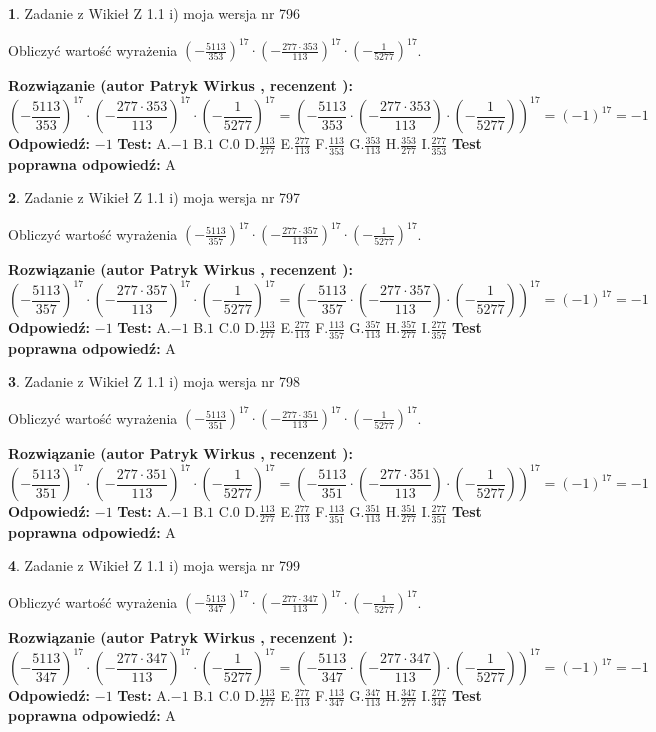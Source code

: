 \documentclass[12pt, a4paper]{article}
\theoremstyle{definition} %
\newtheorem{zad}{}
\newcommand{\zadStart}[1]{\begin{zad}#1\newline}
\newcommand{\zadStop}{\end{zad}}
\newcommand{\rozwStart}[2]{\noindent \textbf{Rozwiązanie (autor #1 , recenzent #2): }\newline}
\newcommand{\rozwStop}{\newline}
\newcommand{\odpStart}{\noindent \textbf{Odpowiedź:}\newline}
\newcommand{\odpStop}{\newline}
\newcommand{\testStart}{\noindent \textbf{Test:}\newline}
\newcommand{\testStop}{\newline}
\newcommand{\kluczStart}{\noindent \textbf{Test poprawna odpowiedź:}\newline}
\newcommand{\kluczStop}{\newline}
\begin{document}
\zadStart{Zadanie z Wikieł Z 1.1 i) moja wersja nr 796}

Obliczyć wartość wyrażenia $(-\frac{5113}{353})^{17} \cdot (-\frac{277 \cdot 353}{113})^{17} \cdot (-\frac{1}{5277})^{17}$.
\zadStop
\rozwStart{Patryk Wirkus}{}
$$(-\frac{5113}{353})^{17} \cdot (-\frac{277 \cdot 353}{113})^{17} \cdot (-\frac{1}{5277})^{17} = (-\frac{5113}{353} \cdot (-\frac{277 \cdot 353}{113}) \cdot (-\frac{1}{5277}))^{17} = (-1)^{17} = -1$$
\rozwStop
\odpStart
$-1$
\odpStop
\testStart
A.$-1$ B.$1$ C.$0$ D.$\frac{113}{277}$ E.$\frac{277}{113}$
F.$\frac{113}{353}$ G.$\frac{353}{113}$
H.$\frac{353}{277}$
I.$\frac{277}{353}$
\testStop
\kluczStart
A
\kluczStop



\zadStart{Zadanie z Wikieł Z 1.1 i) moja wersja nr 797}

Obliczyć wartość wyrażenia $(-\frac{5113}{357})^{17} \cdot (-\frac{277 \cdot 357}{113})^{17} \cdot (-\frac{1}{5277})^{17}$.
\zadStop
\rozwStart{Patryk Wirkus}{}
$$(-\frac{5113}{357})^{17} \cdot (-\frac{277 \cdot 357}{113})^{17} \cdot (-\frac{1}{5277})^{17} = (-\frac{5113}{357} \cdot (-\frac{277 \cdot 357}{113}) \cdot (-\frac{1}{5277}))^{17} = (-1)^{17} = -1$$
\rozwStop
\odpStart
$-1$
\odpStop
\testStart
A.$-1$ B.$1$ C.$0$ D.$\frac{113}{277}$ E.$\frac{277}{113}$
F.$\frac{113}{357}$ G.$\frac{357}{113}$
H.$\frac{357}{277}$
I.$\frac{277}{357}$
\testStop
\kluczStart
A
\kluczStop



\zadStart{Zadanie z Wikieł Z 1.1 i) moja wersja nr 798}

Obliczyć wartość wyrażenia $(-\frac{5113}{351})^{17} \cdot (-\frac{277 \cdot 351}{113})^{17} \cdot (-\frac{1}{5277})^{17}$.
\zadStop
\rozwStart{Patryk Wirkus}{}
$$(-\frac{5113}{351})^{17} \cdot (-\frac{277 \cdot 351}{113})^{17} \cdot (-\frac{1}{5277})^{17} = (-\frac{5113}{351} \cdot (-\frac{277 \cdot 351}{113}) \cdot (-\frac{1}{5277}))^{17} = (-1)^{17} = -1$$
\rozwStop
\odpStart
$-1$
\odpStop
\testStart
A.$-1$ B.$1$ C.$0$ D.$\frac{113}{277}$ E.$\frac{277}{113}$
F.$\frac{113}{351}$ G.$\frac{351}{113}$
H.$\frac{351}{277}$
I.$\frac{277}{351}$
\testStop
\kluczStart
A
\kluczStop



\zadStart{Zadanie z Wikieł Z 1.1 i) moja wersja nr 799}

Obliczyć wartość wyrażenia $(-\frac{5113}{347})^{17} \cdot (-\frac{277 \cdot 347}{113})^{17} \cdot (-\frac{1}{5277})^{17}$.
\zadStop
\rozwStart{Patryk Wirkus}{}
$$(-\frac{5113}{347})^{17} \cdot (-\frac{277 \cdot 347}{113})^{17} \cdot (-\frac{1}{5277})^{17} = (-\frac{5113}{347} \cdot (-\frac{277 \cdot 347}{113}) \cdot (-\frac{1}{5277}))^{17} = (-1)^{17} = -1$$
\rozwStop
\odpStart
$-1$
\odpStop
\testStart
A.$-1$ B.$1$ C.$0$ D.$\frac{113}{277}$ E.$\frac{277}{113}$
F.$\frac{113}{347}$ G.$\frac{347}{113}$
H.$\frac{347}{277}$
I.$\frac{277}{347}$
\testStop
\kluczStart
A
\kluczStop
\end{document}

